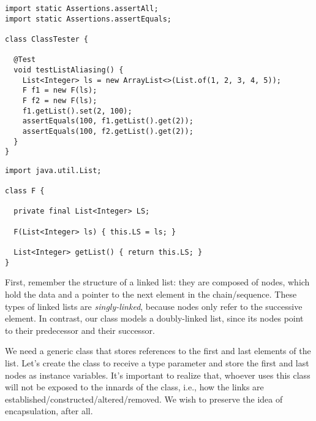 
\begin{lstlisting}[language=MyJava]
import static Assertions.assertAll;
import static Assertions.assertEquals;

class ClassTester {

  @Test
  void testListAliasing() {
    List<Integer> ls = new ArrayList<>(List.of(1, 2, 3, 4, 5));
    F f1 = new F(ls);
    F f2 = new F(ls);
    f1.getList().set(2, 100);
    assertEquals(100, f1.getList().get(2));
    assertEquals(100, f2.getList().get(2));
  }
}
\end{lstlisting}

\begin{lstlisting}[language=MyJava]
import java.util.List;

class F {
  
  private final List<Integer> LS;
  
  F(List<Integer> ls) { this.LS = ls; }
  
  List<Integer> getList() { return this.LS; }
}
\end{lstlisting}


First, remember the structure of a linked list: they are composed of nodes, which hold the data and a pointer to the next element in the chain/sequence. These types of linked lists are \emph{singly-linked}, because nodes only refer to the successive element. In contrast, our class models a doubly-linked list, since its nodes point to their predecessor and their successor. 

We need a generic class that stores references to the first and last elements of the list. Let's create the  class to receive a type parameter  and store the first and last nodes as instance variables. It's important to realize that, whoever uses this class will not be exposed to the innards of the class, i.e., how the links are established/constructed/altered/removed. We wish to preserve the idea of encapsulation, after all.


